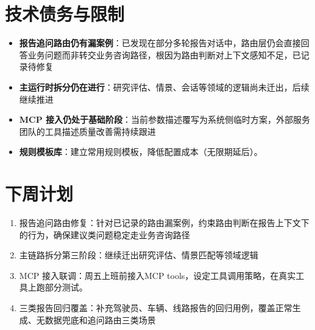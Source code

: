 \documentclass[UTF8]{ctexart}
\begin{document}
\section{技术债务与限制}

\begin{itemize}
\item \textbf{报告追问路由仍有漏案例}：已发现在部分多轮报告对话中，路由层仍会直接回答业务问题而非转交业务咨询路径，根因为路由判断对上下文感知不足，已记录待修复
\item \textbf{主运行时拆分仍在进行}：研究评估、情景、会话等领域的逻辑尚未迁出，后续继续推进
\item \textbf{MCP 接入仍处于基础阶段}：当前参数描述覆写为系统侧临时方案，外部服务团队的工具描述质量改善需持续跟进
\item \textbf{规则模板库}：建立常用规则模板，降低配置成本（无限期延后）。
\end{itemize}

\section{下周计划}

\begin{enumerate}
\item 报告追问路由修复：针对已记录的路由漏案例，约束路由判断在报告上下文下的行为，确保建议类问题稳定走业务咨询路径
\item 主链路拆分第三阶段：继续迁出研究评估、情景匹配等领域逻辑
\item MCP 接入联调：周五上班前接入MCP tools，设定工具调用策略，在真实工具上跑部分测试。
\item 三类报告回归覆盖：补充驾驶员、车辆、线路报告的回归用例，覆盖正常生成、无数据兜底和追问路由三类场景
\end{enumerate}
\end{document}
